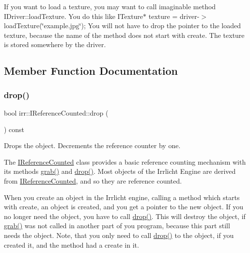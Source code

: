If you want to load a texture, you may want to call imaginable method I\+Driver\+::load\+Texture. You do this like I\+Texture$\ast$ texture = driver-\/$>$load\+Texture(\char`\"{}example.\+jpg\char`\"{}); You will not have to drop the pointer to the loaded texture, because the name of the method does not start with \textquotesingle{}create\textquotesingle{}. The texture is stored somewhere by the driver. 

\subsection{Member Function Documentation}
\mbox{\label{classirr_1_1IReferenceCounted_a03856a09355b89d178090c4a5f738543}} 
\subsubsection{\texorpdfstring{drop()}{drop()}}
{\footnotesize\ttfamily bool irr\+::\+I\+Reference\+Counted\+::drop (\begin{DoxyParamCaption}{ }\end{DoxyParamCaption}) const\hspace{0.3cm}{\ttfamily [inline]}}



Drops the object. Decrements the reference counter by one. 

The \hyperlink{classirr_1_1IReferenceCounted}{I\+Reference\+Counted} class provides a basic reference counting mechanism with its methods \hyperlink{classirr_1_1IReferenceCounted_a396f9cdbe311ada278626477b3c6f0f5}{grab()} and \hyperlink{classirr_1_1IReferenceCounted_a03856a09355b89d178090c4a5f738543}{drop()}. Most objects of the Irrlicht Engine are derived from \hyperlink{classirr_1_1IReferenceCounted}{I\+Reference\+Counted}, and so they are reference counted.

When you create an object in the Irrlicht engine, calling a method which starts with \textquotesingle{}create\textquotesingle{}, an object is created, and you get a pointer to the new object. If you no longer need the object, you have to call \hyperlink{classirr_1_1IReferenceCounted_a03856a09355b89d178090c4a5f738543}{drop()}. This will destroy the object, if \hyperlink{classirr_1_1IReferenceCounted_a396f9cdbe311ada278626477b3c6f0f5}{grab()} was not called in another part of you program, because this part still needs the object. Note, that you only need to call \hyperlink{classirr_1_1IReferenceCounted_a03856a09355b89d178090c4a5f738543}{drop()} to the object, if you created it, and the method had a \textquotesingle{}create\textquotesingle{} in it.

